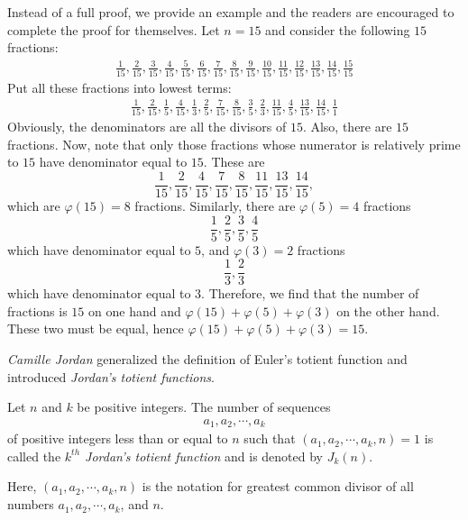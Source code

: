 		Instead of a full proof, we provide an example and the readers  are encouraged to complete the proof for themselves. Let $n=15$ and consider the following $15$ fractions:
			\begin{align*}
				\frac{1}{15},
				\frac{2}{15},
				\frac{3}{15},
				\frac{4}{15},
				\frac{5}{15},
				\frac{6}{15},
				\frac{7}{15},
				\frac{8}{15},
				\frac{9}{15},
				\frac{10}{15},
				\frac{11}{15},
				\frac{12}{15},
				\frac{13}{15},
				\frac{14}{15},
				\frac{15}{15}
			\end{align*}
		Put all these fractions into lowest terms:
			\begin{align*}
				\frac{1}{15},
				\frac{2}{15},
				\frac{1}{5},
				\frac{4}{15},
				\frac{1}{3},
				\frac{2}{5},
				\frac{7}{15},
				\frac{8}{15},
				\frac{3}{5},
				\frac{2}{3},
				\frac{11}{15},
				\frac{4}{5},
				\frac{13}{15},
				\frac{14}{15},
				\frac{1}{1}
			\end{align*}
		Obviously, the denominators are all the divisors of $15$. Also, there are $15$ fractions. Now, note that only those fractions whose numerator is relatively prime to $15$ have denominator equal to $15$. These are $$ \frac{1}{15}, \frac{2}{15},\frac{4}{15},\frac{7}{15},\frac{8}{15},\frac{11}{15},\frac{13}{15},\frac{14}{15},$$ which are $\varphi(15)=8$ fractions. Similarly, there are $\varphi(5)=4$ fractions $$ \frac{1}{5},\frac{2}{5},\frac{3}{5},\frac{4}{5} $$ which have denominator equal to $5$, and $\varphi(3)=2$ fractions $$ \frac{1}{3},\frac{2}{3}$$ which have denominator equal to $3$. Therefore, we find that the number of fractions is $15$ on one hand and $\varphi(15)+\varphi(5)+\varphi(3)$ on the other hand. These two must be equal, hence $\varphi(15)+\varphi(5)+\varphi(3)=15$.

\textit{Camille Jordan} generalized the definition of Euler's totient function and introduced \textit{Jordan's totient functions}.

	\begin{definition}
		Let $n$ and $k$ be positive integers. The number of sequences
			\begin{align*}
				a_1, a_2, \cdots, a_k
			\end{align*}
		of positive integers less than or equal to $n$ such that $(a_1,a_2,\cdots,a_k,n)=1$ is called the \textit{$k^{th}$ Jordan's totient function} and is denoted by $J_k(n)$.
	\end{definition}

	\begin{note}
		Here, $(a_1,a_2,\cdots,a_k,n)$ is the notation for greatest common divisor of all numbers $a_1,a_2,\cdots,a_k$, and $n$.
	\end{note}

